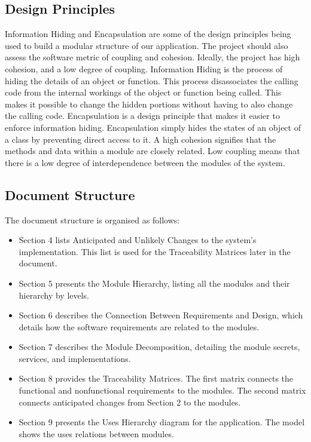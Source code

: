 \documentclass[12pt, titlepage]{article}
\begin{document}
\subsection{Design Principles}

Information Hiding and Encapsulation are some of the design principles being used to build a modular structure of our application. The project should also assess the software metric of coupling and cohesion. Ideally, the project has high cohesion, and a low degree of coupling.
Information Hiding is the process of hiding the details of an object or function. This process disassociates the calling code from the internal workings of the object or function being called. This makes it possible to change the hidden portions without having to also change the calling code. Encapsulation is a design principle that makes it easier to enforce information hiding. Encapsulation simply hides the states of an object of a class by preventing direct access to it. 
A high cohesion signifies that the methods and data within a module are closely related. Low coupling means that there is a low degree of interdependence between the modules of the system. 


\subsection{Document Structure}
	The document structure is organised as follows:
\begin{itemize}

\item Section 4 lists Anticipated and Unlikely Changes to the system's implementation. This list is used for the Traceability Matrices later in the document.

\item Section 5 presents the Module Hierarchy, listing all the modules and their hierarchy by levels. 

\item Section 6 describes the Connection Between Requirements and Design, which details how the software requirements are related to the modules. 

\item Section 7 describes the Module Decomposition, detailing the module secrets, services, and implementations. 

\item Section 8 provides the Traceability Matrices. The first matrix connects the functional and nonfunctional requirements to the modules. The second matrix connects anticipated changes from Section 2 to the modules.

\item Section 9 presents the Uses Hierarchy diagram for the application. The model shows the uses relations between modules.

\end{itemize}	
\end{document}
